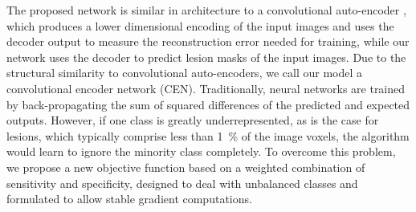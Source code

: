 % 
The proposed network is similar in architecture to a convolutional auto-encoder
\cite{masci2011}, which produces a lower dimensional encoding of the input
images and uses the decoder output to measure the reconstruction error needed
for training, while our network uses the decoder to predict lesion masks of the
input images.
%
% 
%
%
Due to the structural similarity to convolutional auto-encoders, we call our
model a convolutional encoder network (CEN). Traditionally, neural networks are
trained by back-propagating the sum of squared differences of the predicted and
expected outputs. However, if one class is greatly underrepresented, as is the
case for lesions, which typically comprise less than \SI{1}{\percent} of the
image voxels, the algorithm would learn to ignore the minority class completely.
To overcome this problem, we propose a new objective function based on a
weighted combination of sensitivity and specificity, designed to deal with
unbalanced classes and formulated to allow stable gradient computations.



% 
% 
% 
% 
% 
% 
% 
